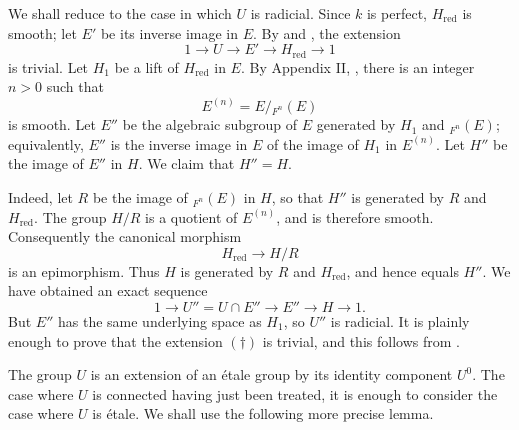 We shall reduce to the case in which \(U\) is radicial.  Since
\(k\) is perfect, \(H_{\mathrm{red}}\) is smooth; let \(E'\) be
its inverse image in \(E\).  By  and , the
extension
\[
  1\longrightarrow U\longrightarrow E'
    \longrightarrow H_{\mathrm{red}}\longrightarrow1
\]
is trivial.  Let \(H_1\) be a lift of \(H_{\mathrm{red}}\) in
\(E\).  By Appendix II, , there is an integer \(n>0\) such
that
\[
  E^{(n)}=E/{}_{F^n}(E)
\]
is smooth.  Let \(E''\) be the algebraic subgroup of \(E\)
generated by \(H_1\) and \({}_{F^n}(E)\); equivalently, \(E''\)
is the inverse image in \(E\) of the image of \(H_1\) in
\(E^{(n)}\).  Let \(H''\) be the image of \(E''\) in \(H\).  We
claim that \(H''=H\).

Indeed, let \(R\) be the image of \({}_{F^n}(E)\) in \(H\), so
that \(H''\) is generated by \(R\) and \(H_{\mathrm{red}}\).
The group \(H/R\) is a quotient of \(E^{(n)}\), and is therefore
smooth.  Consequently the canonical morphism
\[
  H_{\mathrm{red}}\longrightarrow H/R
\]
is an epimorphism.  Thus \(H\) is generated by \(R\) and
\(H_{\mathrm{red}}\), and hence equals \(H''\).  We have obtained
an exact sequence
\[
  \tag{\(\dagger\)}\label{sga3:xvii:subsection:5-5:equation:dagger}
  1\longrightarrow U''=U\cap E''
    \longrightarrow E''\longrightarrow H\longrightarrow1.
\]
But \(E''\) has the same underlying space as \(H_1\), so \(U''\)
is radicial.  It is plainly enough to prove that the extension
\((\dagger)\) is trivial, and this follows from .

The group \(U\) is an extension of an étale group by its identity
component \(U^0\).  The case where \(U\) is connected having just
been treated, it is enough to consider the case where \(U\) is
étale.  We shall use the following more precise lemma.


